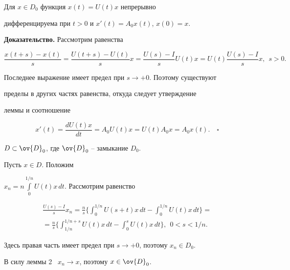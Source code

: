 \begin{lem}


Для $x\in D_{0}$ функция $x(t)=U(t)x$ непрерывно


дифференцируема при $t>0$ и $x'(t)=A_{0}x(t)$, $x(0)=x$.


\end{lem}








{\bf Доказательство.} Рассмотрим равенства 


$$


\frac{x(t+s)-x(t)}{s}=


\frac{U(t+s)-U(t)}{s}x=


\frac{U(s)-I}{s}U(t)x=


U(t)\frac{U(s)-I}{s}x, \ \ s>0.


$$


Последнее выражение имеет предел при $s\to+0$. Поэтому существуют


пределы в других частях равенства, откуда следует утверждение


леммы и соотношение


$$


x'(t)=\frac{dU(t)x}{dt}=


A_{0}U(t)x=U(t)A_{0}x=A_{0}x(t).\quad\square


$$








\begin{lem}


$D\subset \ov{D}_{0}$, где $\ov{D}_{0}$ -- замыкание $D_{0}$.


\end{lem}








\begin{pf}


Пусть $x\in D$. Положим


$x_{n}=n\int\limits^{1/n}_{0}U(t)x\,dt$. Рассмотрим равенство


\begin{multline*}


\frac{U(s)-I}{s}x_{n}=\frac{n}{s}


\bigg\{\int^{1/n}_{0}U(s+t)x\,dt-


\int^{1/n}_{0}U(t)x\,dt\bigg\}= \\ =


\frac{n}{s}\bigg\{\int^{1/n+s}_{1/n}U(t)x\,dt-


\int^{s}_{0}U(t)x\,dt\bigg\}, \ \ 0<s<1/n.


\end{multline*}


Здесь правая часть имеет предел при $s\to+0$, поэтому $x_{n}\in D_{0}$.


В силу леммы 2 \ $x_{n}\to x$, поэтому $x\in \ov{D}_{0}$.


\end{pf}








